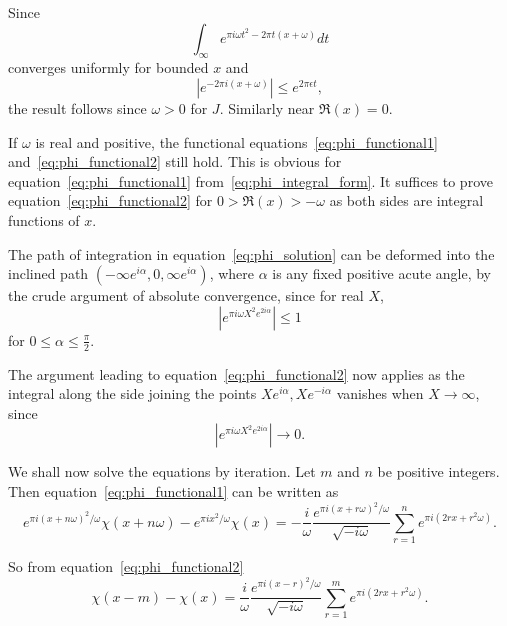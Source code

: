 \documentclass[12pt]{article}
\theoremstyle{remark}
\begin{document}
Since
\begin{equation}\label{eq:convergence1}
\int_\infty e^{\pi i\omega t^2 - 2\pi t(x+\omega)} dt
\end{equation}
converges uniformly for bounded $x$ and
\begin{equation}\label{eq:bound1}
|e^{-2\pi i(x+\omega)}| \leq e^{2\pi \epsilon t},
\end{equation}
the result follows since $\omega > 0$ for $J$. Similarly near $\Re(x) = 0$.

If $\omega$ is real and positive, the functional equations~\eqref{eq:phi_functional1} and~\eqref{eq:phi_functional2} still hold. This is obvious for equation~\eqref{eq:phi_functional1} from~\eqref{eq:phi_integral_form}. It suffices to prove equation~\eqref{eq:phi_functional2} for $0 > \Re(x) > -\omega$ as both sides are integral functions of $x$.

The path of integration in equation~\eqref{eq:phi_solution} can be deformed into the inclined path $(-\infty e^{i\alpha}, 0, \infty e^{i\alpha})$, where $\alpha$ is any fixed positive acute angle, by the crude argument of absolute convergence, since for real $X$,
\begin{equation}\label{eq:convergence_bound}
|e^{\pi i\omega X^2 e^{2i\alpha}}| \leq 1
\end{equation}
for $0 \leq \alpha \leq \frac{\pi}{2}$.

The argument leading to equation~\eqref{eq:phi_functional2} now applies as the integral along the side joining the points $Xe^{i\alpha}, Xe^{-i\alpha}$ vanishes when $X \to \infty$, since
\begin{equation}\label{eq:vanishing_bound}
|e^{\pi i\omega X^2 e^{2i\alpha}}| \to 0.
\end{equation}

We shall now solve the equations by iteration. Let $m$ and $n$ be positive integers. Then equation~\eqref{eq:phi_functional1} can be written as
\begin{equation}\label{eq:iteration1}
e^{\pi i(x+n\omega)^2/\omega} \chi(x + n\omega) - e^{\pi ix^2/\omega} \chi(x) = -\frac{i}{\omega} \frac{e^{\pi i(x+r\omega)^2/\omega}}{\sqrt{-i\omega}} \sum_{r=1}^n e^{\pi i(2rx + r^2\omega)}.
\end{equation}

So from equation~\eqref{eq:phi_functional2}
\begin{equation}\label{eq:iteration2}
\chi(x-m) - \chi(x) = \frac{i}{\omega} \frac{e^{\pi i(x-r)^2/\omega}}{\sqrt{-i\omega}} \sum_{r=1}^m e^{\pi i(2rx + r^2\omega)}.
\end{equation}
\end{document}
